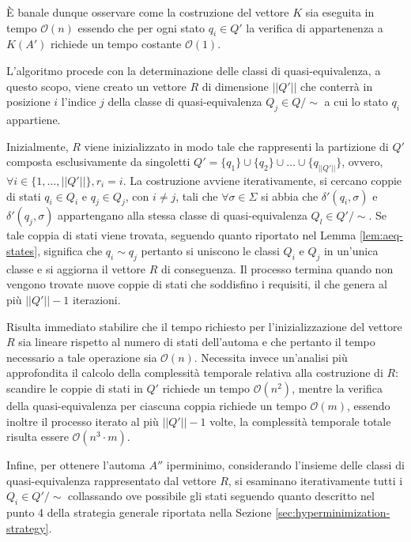 \documentclass[a4paper,12pt]{report} %
\newcommand{\partitioned}[2]{#1\slash\!\!#2}  %
\newcommand{\bigo}[0]{\mathcal{O}}            %
\begin{document}
È banale dunque osservare come la costruzione del vettore $K$ sia eseguita in tempo $\bigo(n)$ essendo che 
per ogni stato $q_i \in Q'$ la verifica di appartenenza a $K(A')$ richiede un tempo costante $\bigo(1)$.

L'algoritmo procede con la determinazione delle classi di quasi-equivalenza, a questo scopo, viene creato un vettore
$R$ di dimensione $||Q'||$ che conterrà in posizione $i$ l'indice $j$ della classe di quasi-equivalenza 
$Q_j \in \partitioned{Q}{\sim}$ a cui lo stato $q_i$ appartiene. 

Inizialmente, $R$ viene inizializzato in modo tale che rappresenti la partizione di $Q'$ composta esclusivamente
da singoletti $Q' = \{ q_1 \} \cup \{ q_2 \} \cup \dots \cup \{ q_{||Q'||} \}$, ovvero, 
$\forall i \in \{ 1, \dots, ||Q'|| \}, r_i = i$. 
La costruzione avviene iterativamente, si cercano coppie di stati $q_i \in Q_i$ e $q_j \in Q_j$,
con $i \neq j$, tali che $\forall \sigma \in \Sigma$ si abbia
che $\delta'(q_i, \sigma)$ e $\delta'(q_j, \sigma)$ appartengano alla stessa classe di
quasi-equivalenza $Q_l \in \partitioned{Q'}{\sim}$.
Se tale coppia di stati viene trovata, seguendo quanto riportato nel Lemma \ref{lem:aeq-states},
significa che $q_i \sim q_j$ pertanto si uniscono le classi $Q_i$ e $Q_j$ in un'unica classe e si
aggiorna il vettore $R$ di conseguenza. Il processo termina quando non vengono trovate nuove coppie
di stati che soddisfino i requisiti, il che genera al più $||Q'|| - 1$ iterazioni.

Risulta immediato stabilire che il tempo richiesto per l'inizializzazione del vettore $R$ sia lineare rispetto
al numero di stati dell'automa e che pertanto il tempo necessario a tale operazione sia $\bigo(n)$.
Necessita invece un'analisi più approfondita il calcolo della complessità temporale relativa
alla costruzione di $R$: scandire le coppie di stati in $Q'$ richiede un tempo $\bigo(n^2)$, mentre la verifica
della quasi-equivalenza per ciascuna coppia richiede un tempo $\bigo(m)$, essendo inoltre il processo iterato
al più $||Q'|| - 1$ volte, la complessità temporale totale risulta essere $\bigo(n^3 \cdot m)$.

Infine, per ottenere l'automa $A''$ iperminimo, considerando l'insieme delle classi di quasi-equivalenza
rappresentato dal vettore $R$, si esaminano iterativamente tutti i $Q_i \in \partitioned{Q'}{\sim}$
collassando ove possibile gli stati seguendo quanto descritto nel punto 4 della strategia generale riportata
nella Sezione \ref{sec:hyperminimization-strategy}.
\end{document}
